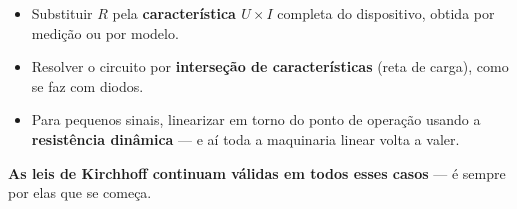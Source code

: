 \begin{questao}[4]{}
{\begin{itemize}
\item Substituir $R$ pela \textbf{característica $U\times I$} completa do
dispositivo, obtida por medição ou por modelo.
\item Resolver o circuito por \textbf{interseção de características} (reta de
carga), como se faz com diodos.
\item Para pequenos sinais, linearizar em torno do ponto de operação usando a
\textbf{resistência dinâmica} --- e aí toda a maquinaria linear volta a valer.
\end{itemize}
\textbf{As leis de Kirchhoff continuam válidas em todos esses casos} --- é
sempre por elas que se começa.}
\end{questao}
